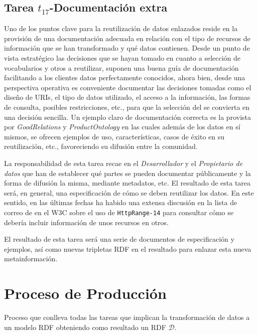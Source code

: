 \subsection{Tarea $t_{17}$-Documentación extra}\label{t17-metodos}
Uno de los puntos clave para la reutilización de datos enlazados reside 
en la provisión de una documentación adecuada en relación con el tipo de recursos 
de información que se han transformado y qué datos contienen. Desde un punto 
de vista estratégico las decisiones que se hayan tomado en cuanto a 
selección de vocabularios y otros \datasets a reutilizar, suponen 
una buena guía de documentación facilitando a los clientes datos 
perfectamente conocidos, ahora bien, desde una perspectiva 
operativa es conveniente documentar las decisiones tomadas como el diseño 
de URIs, el tipo de datos utilizado, el acceso a la información, las formas 
de consulta, posibles restricciones, etc., para que la selección del \dataset 
se convierta en una decisión sencilla. Un ejemplo claro de documentación correcta 
es la provista por \textit{GoodRelations} y \textit{ProductOntology} en las cuales 
además de los datos en sí mismos, se ofrecen ejemplos de uso, características, casos 
de éxito en su reutilización, etc., favoreciendo su difusión entre la comunidad.

La responsabilidad de esta tarea recae en el \textit{Desarrollador} y el \textit{Propietario de datos} que han de establecer 
qué partes se pueden documentar públicamente y la forma de difusión la misma, mediante metadatos, etc. El resultado 
de esta tarea será, en general, una especificación de cómo se deben reutilizar los datos. En este sentido, en las últimas 
fechas ha habido una extensa discusión en la lista de correo de \lod en el \gls{W3C} sobre el uso de \texttt{HttpRange-14} para 
consultar cómo se debería incluir información de unos recursos en otros.

El resultado de esta tarea será una serie de documentos de especificación y ejemplos, así como nuevas tripletas \gls{RDF} 
en el \dataset resultado para enlazar esta nueva metainformación.

\section{Proceso de Producción}\label{sect:produccion}

\begin{definition}[Producción]
Proceso que conlleva todas las tareas que implican la transformación de datos a un modelo RDF obteniendo 
como resultado un \dataset \gls{RDF} $\mathcal{D}$.
\end{definition}

